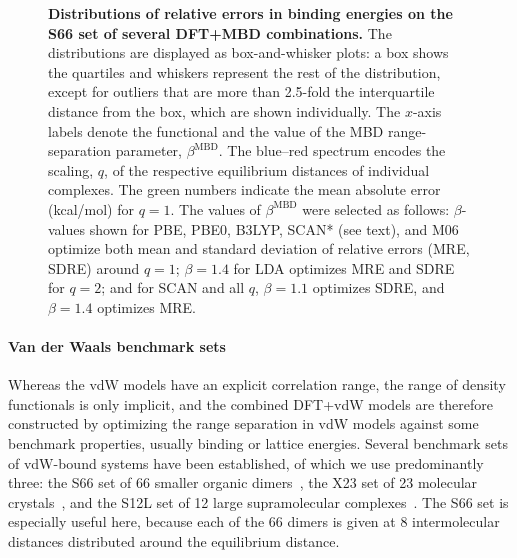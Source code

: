 \begin{figure}[t!]
\caption{\textbf{Distributions of relative errors in binding energies on the S66 set of several DFT+MBD combinations.}
The distributions are displayed as box-and-whisker plots: a box shows the quartiles and whiskers represent the rest of the distribution, except for outliers that are more than 2.5-fold the interquartile distance from the box, which are shown individually.
The $x$-axis labels denote the functional and the value of the MBD range-separation parameter, $\beta^\text{MBD}$.
The blue--red spectrum encodes the scaling, $q$, of the respective equilibrium distances of individual complexes.
The green numbers indicate the mean absolute error (kcal/mol) for $q=1$.
The values of $\beta^\text{MBD}$ were selected as follows: $\beta$-values shown for PBE, PBE0, B3LYP, SCAN* (see text), and M06 optimize both mean and standard deviation of relative errors (MRE, SDRE) around $q=1$; $\beta=1.4$ for LDA optimizes MRE and SDRE for $q=2$; and for SCAN and all $q$, $\beta=1.1$ optimizes SDRE, and $\beta=1.4$ optimizes MRE\@.
}\label{fig:s66-dists}
\end{figure}

\paragraph{Van der Waals benchmark sets}

Whereas the vdW models have an explicit correlation range, the range of density functionals is only implicit, and the combined DFT+vdW models are therefore constructed by optimizing the range separation in vdW models against some benchmark properties, usually binding or lattice energies.
Several benchmark sets of vdW-bound systems have been established, of which we use predominantly three: the S66 set of 66 smaller organic dimers~\cite{RezacJCTC11}, the X23 set of 23 molecular crystals~\cite{ReillyJCP13}, and the S12L set of 12 large supramolecular complexes~\cite{RisthausJCTC13,AmbrosettiJPCL14}.
The S66 set is especially useful here, because each of the 66 dimers is given at 8 intermolecular distances distributed around the equilibrium distance.

